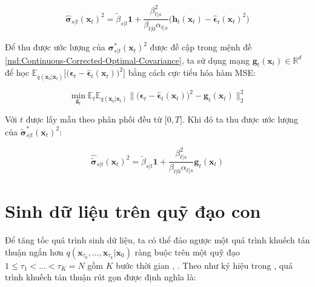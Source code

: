\documentclass[14pt, a4paper]{article}
\numberwithin{equation}{section}
\numberwithin{figure}{section}
\numberwithin{dl}{section}
\numberwithin{md}{section}
\numberwithin{bd}{section}
\numberwithin{dn}{section}
\numberwithin{hq}{section}
\begin{document}
    \begin{equation}
        \hat{\boldsymbol{\sigma}}_{s \vert t} (\boldsymbol{x}_t)^2 = \tilde{\beta}_{s \vert t} \boldsymbol{1} + \dfrac{\beta_{t \vert s}^2}{\beta_{t \vert 0} \alpha_{t \vert s}} \big( \boldsymbol{h}_t (\boldsymbol{x}_t) - \hat{\boldsymbol{\epsilon}}_t (\boldsymbol{x}_t)^2 \big)
    \end{equation}

    Để thu được ước lượng của $\boldsymbol{\sigma}_{s \vert t}^{\ast} (\boldsymbol{x}_t)^2$ được đề cập trong mệnh đề \ref{md:Continuous-Corrected-Optimal-Covariance}, ta sử dụng mạng $\boldsymbol{g}_t(\boldsymbol{x}_t) \in \mathbb{R}^d$ để học $\mathbb{E}_{q(\boldsymbol{x}_0 \vert \boldsymbol{x}_t)} \big \lbrack \big( \boldsymbol{\epsilon}_t - \hat{\boldsymbol{\epsilon}}_t (\boldsymbol{x}_t) \big)^2 \big \rbrack$ bằng cách cực tiểu hóa hàm MSE:

    \begin{equation}
        \min_{\boldsymbol{g}_t} \mathbb{E}_t \mathbb{E}_{q(\boldsymbol{x}_0 \vert \boldsymbol{x}_t)} \lVert \big( \boldsymbol{\epsilon}_t - \hat{\boldsymbol{\epsilon}}_t (\boldsymbol{x}_t) \big)^2 - \boldsymbol{g}_t (\boldsymbol{x}_t) \rVert_2^2
    \end{equation}

    Với $t$ được lấy mẫu theo phân phối đều từ $\lbrack 0, T \rbrack$. Khi đó ta thu được ước lượng của $\tilde{\boldsymbol{\sigma}}_{s \vert t}^{\ast} (\boldsymbol{x}_t)^2$:

    \begin{equation}
        \hat{\tilde{\boldsymbol{\sigma}}}_{s \vert t} (\boldsymbol{x}_t)^2 = \tilde{\beta}_{s \vert t} \boldsymbol{1} + \dfrac{\beta_{t \vert s}^2}{\beta_{t \vert 0} \alpha_{t \vert s}} \boldsymbol{g}_t (\boldsymbol{x}_t)
    \end{equation}

    \section{Sinh dữ liệu trên quỹ đạo con}

    Để tăng tốc quá trình sinh dữ liệu, ta có thể đảo ngược một quá trình khuếch tán thuận ngắn hơn $q(\boldsymbol{x}_{\tau_0}, \dots, \boldsymbol{x}_{\tau_k} \vert \boldsymbol{x}_0)$ ràng buộc trên một quỹ đạo $1 \leq \tau_1 < \dots < \tau_K = N$ gồm $K$ bước thời gian \cite{song2020denoising}, \cite{bao2021analytic}.
    Theo như ký hiệu trong \cite{bao2021analytic}, quá trình khuếch tán thuận rút gọn được định nghĩa là:
\end{document}
